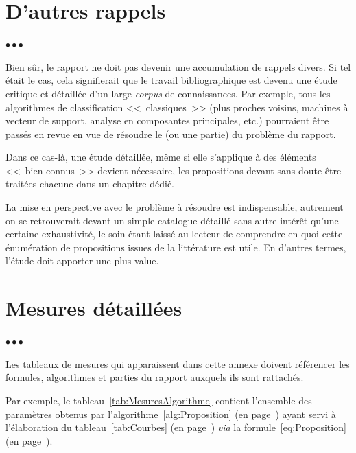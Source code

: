 \documentclass[11pt, french, screen, research-development]{report-rd-info}
\newenvironment{explanation}
{\color{blue}
 \begin{list}{}{\hspace{0.2\textwidth}\color{blue}}\item $\bullet\bullet\bullet$
}
{\end{list}}
\begin{document}
\chapter{D'autres rappels}
\label{ann:RappelsInutiles}

\begin{explanation}
   Bien sûr, le rapport ne doit pas devenir une accumulation de rappels divers.
   Si tel était le cas, cela signifierait que le travail bibliographique est devenu une étude critique et détaillée d'un large \emph{corpus} de connaissances.
   Par exemple, tous les algorithmes de classification <<~classiques~>> (plus proches voisins, machines à vecteur de support, analyse en composantes principales, etc.) pourraient être passés en revue en vue de résoudre le (ou une partie) du problème du rapport.

   Dans ce cas-là, une étude détaillée, même si elle s'applique à des éléments <<~bien connus~>> devient nécessaire, les propositions devant sans doute être traitées chacune dans un chapitre dédié.

   La mise en perspective avec le problème à résoudre est indispensable, autrement on se retrouverait devant un simple catalogue détaillé sans autre intérêt qu'une certaine exhaustivité, le soin étant laissé au lecteur de comprendre en quoi cette énumération de propositions issues de la littérature est utile.
   En d'autres termes, l'étude doit apporter une plus-value.
\end{explanation}

\chapter{Mesures détaillées}
\label{ann:Mesures}

\begin{explanation}
   Les tableaux de mesures qui apparaissent dans cette annexe doivent référencer les formules, algorithmes et parties du rapport auxquels ils sont rattachés.

   Par exemple, le tableau~\ref{tab:MesuresAlgorithme} contient l'ensemble des paramètres obtenus par l'algorithme~\ref{alg:Proposition} (en page~\pageref{alg:Proposition}) ayant servi à l'élaboration du tableau~\ref{tab:Courbes} (en page~\pageref{tab:Courbes}) \emph{via} la formule~\ref{eq:Proposition} (en page~\pageref{eq:Proposition}).
\end{explanation}
\end{document}
